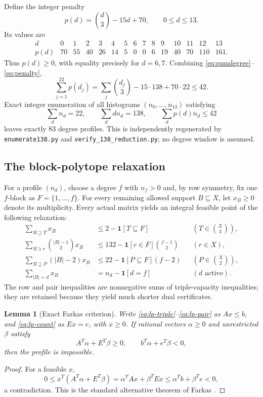 \documentclass[11pt]{amsart}
\newtheorem{lemma}[theorem]{Lemma}
\begin{document}
Define the integer penalty
\begin{equation}\label{eq:penalty}
  p(d)=\binom d3-15d+70,\qquad 0\le d\le13.
\end{equation}
Its values are
\[
\begin{array}{c|rrrrrrrrrrrrrr}
d&0&1&2&3&4&5&6&7&8&9&10&11&12&13\\\hline
p(d)&70&55&40&26&14&5&0&0&6&19&40&70&110&161.
\end{array}
\]
Thus $p(d)\ge0$, with equality precisely for $d=6,7$. Combining \eqref{eq:sumdegree}--\eqref{eq:penalty},
\begin{equation}\label{eq:penaltybudget}
  \sum_{j=1}^{22}p(d_j)
  =\sum_j\binom{d_j}{3}-15\cdot138+70\cdot22
  \le42.
\end{equation}
Exact integer enumeration of all histograms $(n_0,\dots,n_{13})$ satisfying
\[
  \sum_dn_d=22,
  \qquad \sum_ddn_d=138,
  \qquad \sum_dp(d)n_d\le42
\]
leaves exactly $83$ degree profiles. This is independently regenerated by \texttt{enumerate138.py} and \texttt{verify\_138\_reduction.py}; no degree window is assumed.

\subsection{The block-polytope relaxation}
For a profile $(n_d)$, choose a degree $f$ with $n_f>0$ and, by row symmetry, fix one $f$-block as $F=\{1,\dots,f\}$. For every remaining allowed support $B\subseteq X$, let $x_B\ge0$ denote its multiplicity. Every actual matrix yields an integral feasible point of the following relaxation:
\begin{align}
 \sum_{B\supseteq T}x_B
 &\le2-\mathbf1[T\subseteq F]
 &&(T\in\binom X3), \label{eq:lp-triple}\\
 \sum_{B\ni r}\binom{|B|-1}{2}x_B
 &\le132-\mathbf1[r\in F]\binom{f-1}{2}
 &&(r\in X), \label{eq:lp-row}\\
 \sum_{B\supseteq P}(|B|-2)x_B
 &\le22-\mathbf1[P\subseteq F](f-2)
 &&(P\in\binom X2), \label{eq:lp-pair}\\
 \sum_{|B|=d}x_B
 &=n_d-\mathbf1[d=f]
 &&(d\text{ active}). \label{eq:lp-count}
\end{align}
The row and pair inequalities are nonnegative sums of triple-capacity inequalities; they are retained because they yield much shorter dual certificates.

\begin{lemma}[Exact Farkas criterion]\label{lem:farkas}
Write \eqref{eq:lp-triple}--\eqref{eq:lp-pair} as $Ax\le b$, and \eqref{eq:lp-count} as $Ex=e$, with $x\ge0$. If rational vectors $\alpha\ge0$ and unrestricted $\beta$ satisfy
\[
 A^T\alpha+E^T\beta\ge0,
 \qquad b^T\alpha+e^T\beta<0,
\]
then the profile is impossible.
\end{lemma}
\begin{proof}
For a feasible $x$,
\[
0\le x^T(A^T\alpha+E^T\beta)
=\alpha^TAx+\beta^TEx
\le\alpha^Tb+\beta^Te<0,
\]
a contradiction. This is the standard alternative theorem of Farkas \cite{Farkas1902}.
\end{proof}
\end{document}
